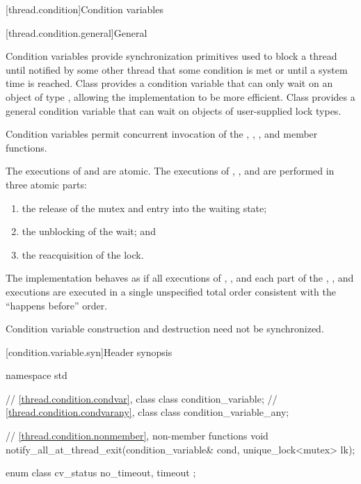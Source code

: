 [thread.condition]{Condition variables}

[thread.condition.general]{General}

\pnum
Condition variables provide synchronization primitives used to block a thread until
notified by some other thread that some condition is met or until a system time is
reached. Class  provides a condition variable that can only
wait on an object of type , allowing the implementation
to be more efficient. Class  provides a general
condition variable that can wait on objects of user-supplied lock types.

\pnum
Condition variables permit concurrent invocation of the , ,
,  and  member functions.

\pnum
The executions of  and 
are atomic.
The executions of , , and  are performed
in three atomic parts:
\begin{enumerate}
\item the release of the mutex and entry into the waiting state;
\item the unblocking of the wait; and
\item the reacquisition of the lock.
\end{enumerate}

\pnum
The implementation behaves as if all executions of , , and each
part of the , , and  executions are
executed in a single unspecified total order consistent with the ``happens before'' order.

\pnum
Condition variable construction and destruction need not be synchronized.

[condition.variable.syn]{Header  synopsis}

%
%
\begin{codeblock}
namespace std {
  // \ref{thread.condition.condvar}, class 
  class condition_variable;
  // \ref{thread.condition.condvarany}, class 
  class condition_variable_any;

  // \ref{thread.condition.nonmember}, non-member functions
  void notify_all_at_thread_exit(condition_variable& cond, unique_lock<mutex> lk);

  enum class cv_status { no_timeout, timeout };
}
\end{codeblock}

